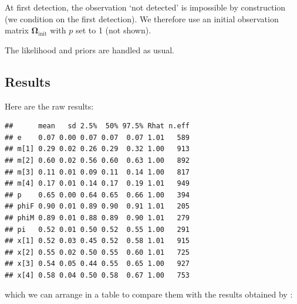 \documentclass[
  12pt,
]{krantz}
\begin{document}
At first detection, the observation `not detected' is impossible by construction (we condition on the first detection). We therefore use an initial observation matrix \(\mathbf{\Omega}_{\text{init}}\) with \(p\) set to 1 (not shown).

The likelihood and priors are handled as usual.

\subsection{Results}\label{results-2}

Here are the raw results:

\begin{verbatim}
##      mean   sd 2.5%  50% 97.5% Rhat n.eff
## e    0.07 0.00 0.07 0.07  0.07 1.01   589
## m[1] 0.29 0.02 0.26 0.29  0.32 1.00   913
## m[2] 0.60 0.02 0.56 0.60  0.63 1.00   892
## m[3] 0.11 0.01 0.09 0.11  0.14 1.00   817
## m[4] 0.17 0.01 0.14 0.17  0.19 1.01   949
## p    0.65 0.00 0.64 0.65  0.66 1.00   394
## phiF 0.90 0.01 0.89 0.90  0.91 1.01   205
## phiM 0.89 0.01 0.88 0.89  0.90 1.01   279
## pi   0.52 0.01 0.50 0.52  0.55 1.00   291
## x[1] 0.52 0.03 0.45 0.52  0.58 1.01   915
## x[2] 0.55 0.02 0.50 0.55  0.60 1.01   725
## x[3] 0.54 0.05 0.44 0.55  0.65 1.00   927
## x[4] 0.58 0.04 0.50 0.58  0.67 1.00   753
\end{verbatim}

which we can arrange in a table to compare them with the results obtained by \citet{pradel2008sex}:
\end{document}
